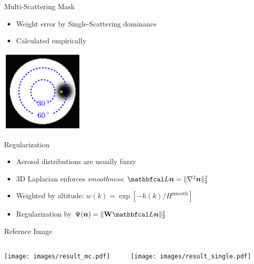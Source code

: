 \documentclass[compress,red,12pt]{beamer}
\begin{document}

\begin{frame}[label=mask]{Multi-Scattering Mask}
  \begin{itemize}
  \item Weight error by Single-Scattering dominance
  \item Calculated empirically
  \end{itemize}
  \centerline{\includegraphics[height=4cm]{images/sun_mask.pdf}}
  \hfill\hyperlink{objective<3>}{} 
\end{frame}


\begin{frame}[label=regularization]{Regularization}
  \begin{itemize}
  \item Aerosol distributions are usually fuzzy
  \item 3D Laplacian enforces {\em smoothness}: $\Laplacian{\bm n} = \| \nabla^2{\bm  n}\|^2_2$
  \item Weighted by altitude: $w(k)=\exp\left[-h(k)/H^\mathrm{smooth}\right]$
  \item Regularization by $\Psi({\bm n}) = \| {\bf W} \Laplacian{\bm n}\|^2_2$
  \end{itemize}

  \hfill\hyperlink{objective<3>}{}
\end{frame}


\begin{frame}[label=ref_images]{Refernce Image}
  \begin{columns}[T]
    \begin{column}{.5\textwidth}
      \centering
        \texttt{[image: images/result\_mc.pdf]}
    \end{column}
    \begin{column}{.5\textwidth}
      \centering
        \texttt{[image: images/result\_single.pdf]}
    \end{column}
  \end{columns}

  \hfill\hyperlink{objective<2>}{}
\end{frame}
\end{document}
